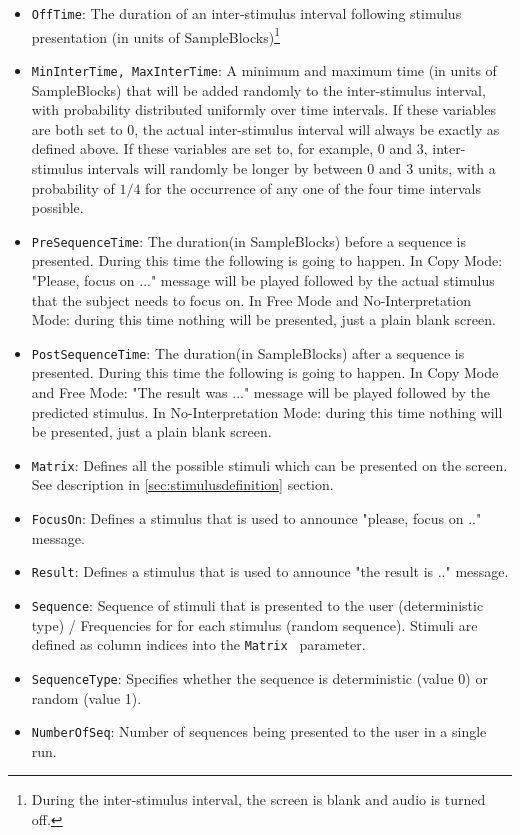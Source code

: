 \documentclass[letterpaper,oneside,12pt]{article}
\begin{document}
\begin{itemize}
 \item {\tt OffTime}: The duration of an inter-stimulus interval following stimulus presentation
       (in units of SampleBlocks)\footnote{During the inter-stimulus interval, the
       screen is blank and audio is turned off.}
 \item {\tt MinInterTime, MaxInterTime}: A minimum and maximum time (in units of SampleBlocks) that will be added randomly
       to the inter-stimulus interval, with probability distributed uniformly over time
       intervals.
       If these variables are both set to 0, the actual inter-stimulus interval will
       always be exactly as defined above.
       If these variables are set to, for example, 0 and 3, inter-stimulus intervals
       will randomly be longer by between 0 and 3 units, with a probability of $1/4$
       for the occurrence of any one of the four time intervals possible.
 \item {\tt PreSequenceTime}: The duration(in SampleBlocks) before a sequence is presented. During this time the following is going to happen. In Copy Mode: "Please, focus on ..." message will be played followed by the actual stimulus that the subject needs to focus on.
 In Free Mode and No-Interpretation Mode: during this time nothing will be presented, just a plain blank screen.
 \item {\tt PostSequenceTime}: The duration(in SampleBlocks) after a sequence is presented. During this time the following is going to happen. In Copy Mode and Free Mode: "The result was ..." message will be played followed by the predicted stimulus.
 In No-Interpretation Mode: during this time nothing will be presented, just a plain blank screen.
 \item {\tt Matrix}: Defines all the possible stimuli which can be presented on the screen. See description in \ref{sec:stimulusdefinition} section.
 \item {\tt FocusOn}: Defines a stimulus that is used to announce "please, focus on .." message.
 \item {\tt Result}: Defines a stimulus that is used to announce "the result is .." message.
 \item {\tt Sequence}: Sequence of stimuli that is presented to the user (deterministic type) / Frequencies for for each stimulus (random sequence).
 Stimuli are defined as column indices into the  {\tt Matrix } parameter.
 \item {\tt SequenceType}: Specifies whether the sequence is deterministic (value 0) or random (value 1).
 \item {\tt NumberOfSeq}: Number of sequences being presented to the user in a single run.

\end{itemize}
\end{document}
